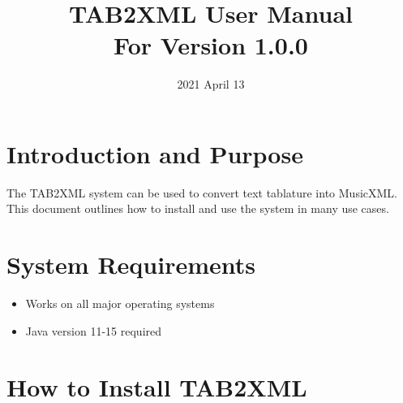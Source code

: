 \documentclass[11pt]{article}
\date{2021 April 13}
\title{TAB2XML User Manual\\\medskip
\large For Version 1.0.0}
\begin{document}
\maketitle
\tableofcontents

\newpage

\section{Introduction and Purpose}
\label{sec:org89b3905}
The TAB2XML system can be used to convert text tablature into MusicXML.  This document outlines how to install and use the system in many use cases.
\section{System Requirements}
\label{sec:orge3e34ef}
\begin{itemize}
\item Works on all major operating systems
\item Java version 11-15 required
\end{itemize}
\section{How to Install TAB2XML}
\label{sec:org067aa54}
\end{document}
